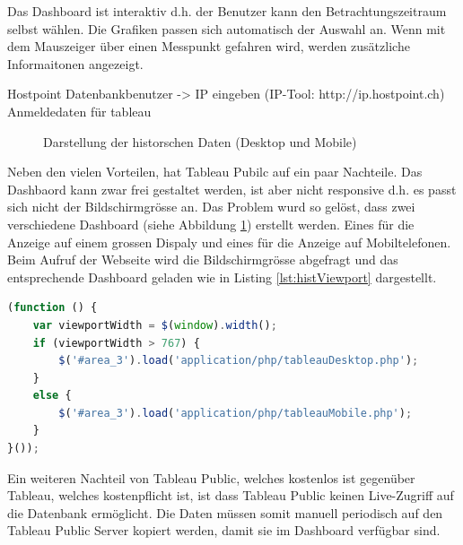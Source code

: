 Das Dashboard ist interaktiv d.h. der Benutzer kann den Betrachtungszeitraum selbst wählen. Die Grafiken passen sich automatisch der Auswahl an.
Wenn mit dem Mauszeiger über einen Messpunkt gefahren wird, werden zusätzliche Informaitonen angezeigt.


Hostpoint
Datenbankbenutzer -> IP eingeben (IP-Tool: http://ip.hostpoint.ch)
Anmeldedaten für tableau


\begin{figure}[h!]
	\centering
	\caption{Darstellung der historschen Daten (Desktop und Mobile)}
	\label{img:tableau}
\end{figure}


\noindent
Neben den vielen Vorteilen, hat Tableau Pubilc auf ein paar Nachteile. Das Dashbaord kann zwar frei gestaltet werden, ist aber nicht responsive d.h. es passt sich nicht der Bildschirmgrösse an. Das Problem wurd so gelöst, dass zwei verschiedene Dashboard (siehe Abbildung \ref{img:tableau}) erstellt werden. Eines für die Anzeige auf einem grossen Dispaly und eines für die Anzeige auf Mobiltelefonen. Beim Aufruf der Webseite wird die Bildschirmgrösse abgefragt und das entsprechende Dashboard geladen wie in Listing \ref{lst:histViewport} dargestellt.

\begin{lstlisting}[label=lst:histViewport,caption=Auswahl des Dashboards anahnd der Bildschirmgrösse, language=JavaScript, style=htmlcssjs]
(function () {
	var viewportWidth = $(window).width();
	if (viewportWidth > 767) {
		$('#area_3').load('application/php/tableauDesktop.php');
	}
	else {
		$('#area_3').load('application/php/tableauMobile.php');
	}
}());
\end{lstlisting}


\noindent
Ein weiteren Nachteil von Tableau Public, welches kostenlos ist gegenüber Tableau, welches kostenpflicht ist, ist dass Tableau Public keinen Live-Zugriff auf die Datenbank ermöglicht. Die Daten müssen somit manuell periodisch auf den Tableau Public Server kopiert werden, damit sie im Dashboard verfügbar sind.



